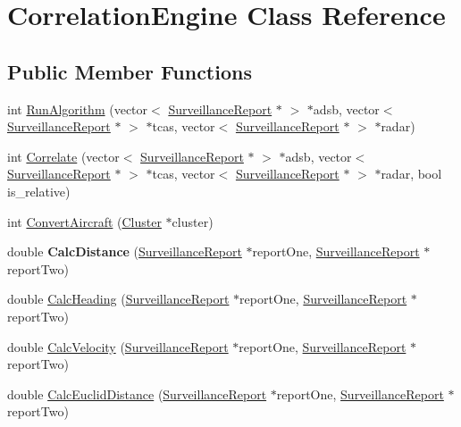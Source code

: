 \hypertarget{class_correlation_engine}{}\section{Correlation\+Engine Class Reference}
\label{class_correlation_engine}
\subsection*{Public Member Functions}
\begin{DoxyCompactItemize}
\item 
int \hyperlink{class_correlation_engine_aaf1dbba7cc0ae1b7b16f52b1087638b0}{Run\+Algorithm} (vector$<$ \hyperlink{class_surveillance_report}{Surveillance\+Report} $\ast$ $>$ $\ast$adsb, vector$<$ \hyperlink{class_surveillance_report}{Surveillance\+Report} $\ast$ $>$ $\ast$tcas, vector$<$ \hyperlink{class_surveillance_report}{Surveillance\+Report} $\ast$ $>$ $\ast$radar)
\item 
int \hyperlink{class_correlation_engine_a7bc83eae35d04f764c9052a3c1a2e1f4}{Correlate} (vector$<$ \hyperlink{class_surveillance_report}{Surveillance\+Report} $\ast$ $>$ $\ast$adsb, vector$<$ \hyperlink{class_surveillance_report}{Surveillance\+Report} $\ast$ $>$ $\ast$tcas, vector$<$ \hyperlink{class_surveillance_report}{Surveillance\+Report} $\ast$ $>$ $\ast$radar, bool is\+\_\+relative)
\item 
int \hyperlink{class_correlation_engine_a1046d9bac32e32e574ebf15a75c62cd2}{Convert\+Aircraft} (\hyperlink{class_cluster}{Cluster} $\ast$cluster)
\item 
\hypertarget{class_correlation_engine_a0e9b298dfad1ecd76e2597a12c31ce6d}{}double {\bfseries Calc\+Distance} (\hyperlink{class_surveillance_report}{Surveillance\+Report} $\ast$report\+One, \hyperlink{class_surveillance_report}{Surveillance\+Report} $\ast$report\+Two)\label{class_correlation_engine_a0e9b298dfad1ecd76e2597a12c31ce6d}

\item 
double \hyperlink{class_correlation_engine_a4276411ce14a37bd4f3d3073631eea35}{Calc\+Heading} (\hyperlink{class_surveillance_report}{Surveillance\+Report} $\ast$report\+One, \hyperlink{class_surveillance_report}{Surveillance\+Report} $\ast$report\+Two)
\item 
double \hyperlink{class_correlation_engine_a391584f34e92c6c8bd27760b5b42dccf}{Calc\+Velocity} (\hyperlink{class_surveillance_report}{Surveillance\+Report} $\ast$report\+One, \hyperlink{class_surveillance_report}{Surveillance\+Report} $\ast$report\+Two)
\item 
double \hyperlink{class_correlation_engine_a77d8b104be4698fb45d99a377f2b2b8f}{Calc\+Euclid\+Distance} (\hyperlink{class_surveillance_report}{Surveillance\+Report} $\ast$report\+One, \hyperlink{class_surveillance_report}{Surveillance\+Report} $\ast$report\+Two)
\end{DoxyCompactItemize}
